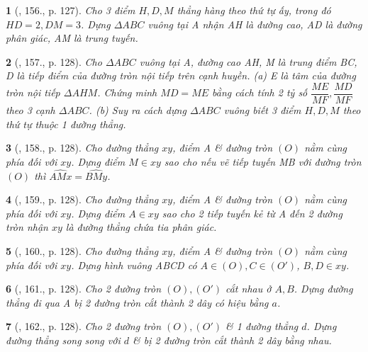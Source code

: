 \documentclass{article}
\newtheorem{baitoan}{}
\begin{document}
\begin{baitoan}[\cite{Binh_Toan_9_tap_1}, 156., p. 127]
	Cho 3 điểm $H,D,M$ thẳng hàng theo thứ tự ấy, trong đó $HD = 2,DM = 3$. Dựng $\Delta ABC$ vuông tại A nhận AH là đường cao, AD là đường phân giác, AM là trung tuyến.
\end{baitoan}

\begin{baitoan}[\cite{Binh_Toan_9_tap_1}, 157., p. 128]
	Cho $\Delta ABC$ vuông tại A, đường cao AH, M là trung điểm BC, D là tiếp điểm của đường tròn nội tiếp trên cạnh huyền. (a) E là tâm của đường tròn nội tiếp $\Delta AHM$. Chứng minh $MD = ME$ bằng cách tính 2 tỷ số $\dfrac{ME}{MF},\dfrac{MD}{MF}$ theo 3 cạnh $\Delta ABC$. (b) Suy ra cách dựng $\Delta ABC$ vuông biết 3 điểm $H,D,M$ theo thứ tự thuộc 1 đường thẳng.
\end{baitoan}

\begin{baitoan}[\cite{Binh_Toan_9_tap_1}, 158., p. 128]
	Cho đường thẳng $xy$, điểm A \& đường tròn $(O)$ nằm cùng phía đối với $xy$. Dựng điểm $M\in xy$ sao cho nếu vẽ tiếp tuyến MB với đường tròn $(O)$ thì $\widehat{AMx} = \widehat{BMy}$.
\end{baitoan}

\begin{baitoan}[\cite{Binh_Toan_9_tap_1}, 159., p. 128]
	Cho đường thẳng $xy$, điểm A \& đường tròn $(O)$ nằm cùng phía đối với $xy$. Dựng điểm $A\in xy$ sao cho 2 tiếp tuyến kẻ từ A đến 2 đường tròn nhận $xy$ là đường thẳng chứa tia phân giác.
\end{baitoan}

\begin{baitoan}[\cite{Binh_Toan_9_tap_1}, 160., p. 128]
	Cho đường thẳng $xy$, điểm A \& đường tròn $(O)$ nằm cùng phía đối với $xy$. Dựng hình vuông ABCD có $A\in(O),C\in(O')$, $B,D\in xy$.
\end{baitoan}

\begin{baitoan}[\cite{Binh_Toan_9_tap_1}, 161., p. 128]
	Cho 2 đường tròn $(O),(O')$ cắt nhau ở $A,B$. Dựng đường thẳng đi qua A bị 2 đường tròn cắt thành 2 dây có hiệu bằng $a$.
\end{baitoan}

\begin{baitoan}[\cite{Binh_Toan_9_tap_1}, 162., p. 128]
	Cho 2 đường tròn $(O),(O')$ \& 1 đường thẳng $d$. Dựng đường thẳng song song với $d$ \& bị 2 đường tròn cắt thành 2 dây bằng nhau.
\end{baitoan}
\end{document}
